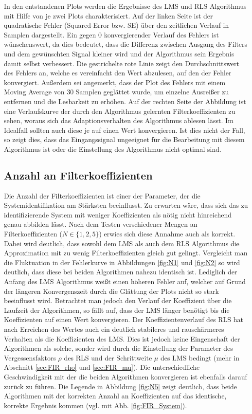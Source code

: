 In den entstandenen Plots werden die Ergebnisse des LMS und RLS Algorithmus mit Hilfe von je zwei Plots charakterisiert. 
Auf der linken Seite ist der quadratische Fehler (Squared-Error bzw. SE) über den zeitlichen Verlauf in Samplen dargestellt. 
Ein gegen 0 konvergierender Verlauf des Fehlers ist wünschenswert, da dies bedeutet, dass die Differenz zwischen Ausgang des Filters und dem gewünschten Signal kleiner wird und der Algorithmus sein Ergebnis damit selbst verbessert.
Die gestrichelte rote Linie zeigt den Durchschnittswert des Fehlers an, welche es vereinfacht den Wert abzulesen, auf den der Fehler konvergiert.
Außerdem sei angemerkt, dass der Plot des Fehlers mit einem Moving Average von 30 Samplen geglättet wurde, um einzelne Ausreißer zu entfernen und die Lesbarkeit zu erhöhen.
Auf der rechten Seite der Abbildung ist eine Verlaufskurve der durch den Algorithmus gelernten Filterkoeffizienten zu sehen, woraus sich das Adaptionsverhalten des Algorithmus ablesen lässt.
Im Idealfall sollten auch diese je auf einen Wert konvergieren.
Ist dies nicht der Fall, so zeigt dies, dass das Eingangssignal ungeeignet für die Bearbeitung mit diesem Algorithmus ist oder die Einstellung des Algorithmus nicht optimal sind.



\subsection{Anzahl an Filterkoeffizienten}

Die Anzahl der Filterkoeffizienten ist einer der Parameter, der die Systemidentifikation am Stärksten beeinflusst. 
Zu erwarten wäre, dass sich das zu identifizierende System mit weniger Koeffizienten als nötig nicht hinreichend genau abbilden lässt. 
Nach dem Testen verschiedener Mengen an Filterkoeffizienten ($N \in \{1, 2, 5\}$) erwies sich diese Annahme auch als korrekt.
Dabei wird deutlich, dass sowohl dem LMS als auch dem RLS Algorithmus die Approximation mit zu wenig Filterkoeffizienten gleich gut gelingt.
Vergleicht man die Fluktuation in der Fehlerkurve in Abbildungen \ref{fig:N1} und \ref{fig:N2} so wird deutlich, dass diese bei beiden Algorithmen nahezu identisch ist.
Lediglich der Anfang des LMS Algorithmus weißt einen höheren Fehler auf, welcher auf Grund der längeren Konvergenszeit durch die Glättung der Plots nicht so stark beeinflusst wird.
Betrachtet man jedoch den Verlauf der Koeffizient über die Laufzeit der Algorithmen, so fällt auf, dass der LMS länger benötigt bis die Koeffizienten auf einen Wert konvergieren.
Der Koeffizientenverlauf des RLS hat nach Erreichen des Wertes auch ein deutlich stabileres und rauschärmeres Verhalten als die Koeffizienten des LMS.
Dies ist jedoch keine Eingenschaft der Algorithmen als solche, sonder wird durch die Einstellung der Parameter des Vergessensfaktors $\rho$ des RLS und der Schrittweite $\mu$ des LMS bedingt (mehr in Abschnitt \ref{sec:FIR_rho} und \ref{sec:FIR_mu}).
Die unterschiedliche Geschwindigkeit mit der die beiden Algorithmen konvergieren ist ebenfalls darauf zurück zu führen.
Die Legende in Abbildung \ref{fig:N5} zeigt deutlich, dass beide Algorithmen mit der korrekten Anzahl an Koeffizienten auf das identische, korrekte Ergebnis kommen (vgl. mit Abb. \ref{fig:FIR_System}).

